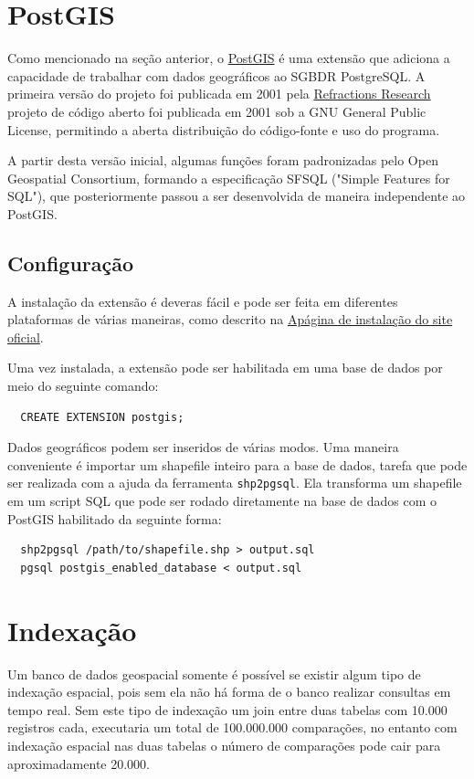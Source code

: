 \documentclass[12pt]{article}
\begin{document}
\section{PostGIS} \label{sec:firstpage}

Como mencionado na seção anterior, o \href{http://postgis.net}{PostGIS} é uma
extensão que adiciona a capacidade de trabalhar com dados geográficos ao SGBDR
PostgreSQL. A primeira versão do projeto foi publicada em 2001 pela
\href{http://refractions.net}{Refractions Research} projeto de código aberto
foi publicada em 2001 sob a GNU General Public License, permitindo a aberta
distribuição do código-fonte e uso do programa.

A partir desta versão inicial, algumas funções foram padronizadas pelo Open
Geospatial Consortium, formando a especificação SFSQL ("Simple Features for
SQL"), que posteriormente passou a ser desenvolvida de maneira independente ao
PostGIS.

\subsection{Configuração}

A instalação da extensão é deveras fácil e pode ser feita em diferentes
plataformas de várias maneiras, como descrito na
\href{http://postgis.net/install}{Apágina de instalação do site oficial}.

Uma vez instalada, a extensão pode ser habilitada em uma base de dados por meio
do seguinte comando:

\begin{verbatim}
  CREATE EXTENSION postgis;
\end{verbatim}

Dados geográficos podem ser inseridos de várias modos. Uma maneira conveniente
é importar um shapefile inteiro para a base de dados, tarefa que pode ser
realizada com a ajuda da ferramenta \texttt{shp2pgsql}. Ela transforma um
shapefile em um script SQL que pode ser rodado diretamente na base de dados com
o PostGIS habilitado da seguinte forma:

\begin{verbatim}
  shp2pgsql /path/to/shapefile.shp > output.sql
  pgsql postgis_enabled_database < output.sql
\end{verbatim}

\section{Indexação}
Um banco de dados geospacial somente é possível se existir algum tipo de indexação
espacial, pois sem ela não há forma de o banco realizar consultas em tempo real.
Sem este tipo de indexação um join entre duas tabelas com 10.000 registros cada,
executaria um total de 100.000.000 comparações, no entanto com indexação espacial
nas duas tabelas o número de comparações pode cair para aproximadamente 20.000.
\end{document}
